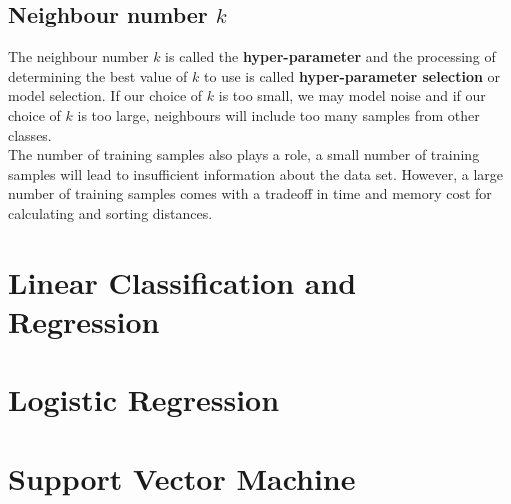 \documentclass[11pt,fleqn]{book} %
\begin{document}
\section{Neighbour number $k$}
The neighbour number $k$ is called the \textbf{hyper-parameter} and the processing of determining the best value of $k$ to use is called \textbf{hyper-parameter selection} or model selection. If our choice of $k$ is too small, we may model noise and if our choice of $k$ is too large, neighbours will include too many samples from other classes.\\

\noindent
The number of training samples also plays a role, a small number of training samples will lead to insufficient information about the data set. However, a large number of training samples comes with a tradeoff in time and memory cost for calculating and sorting distances.



\chapter{Linear Classification and Regression}



\chapter{Logistic Regression}



\chapter{Support Vector Machine}
\end{document}
